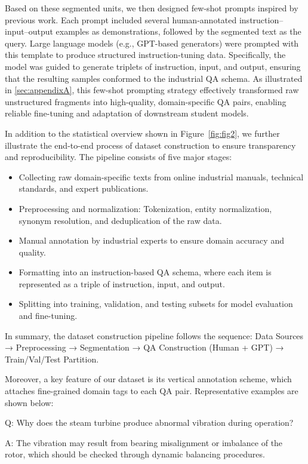 \documentclass[preprint,12pt]{elsarticle}
\def\textbf#1{#1}%
\def\textit#1{#1}%
\begin{document}
Based on these segmented units, we then designed few-shot prompts inspired by previous work\cite{Cui2025,Sahoo2024,Trivedi2025}. Each prompt included several human-annotated instruction–input–output examples as demonstrations, followed by the segmented text as the query. Large language models (e.g., GPT-based generators) were prompted with this template to produce structured instruction-tuning data. Specifically, the model was guided to generate triplets of \textit{instruction}, \textit{input}, and \textit{output}, ensuring that the resulting samples conformed to the industrial QA schema. As illustrated in \ref{sec:appendixA}, this few-shot prompting strategy effectively transformed raw unstructured fragments into high-quality, domain-specific QA pairs, enabling reliable fine-tuning and adaptation of downstream student models.

In addition to the statistical overview shown in Figure~\ref{fig:fig2}, we further illustrate the end-to-end process of dataset construction to ensure transparency and reproducibility. The pipeline consists of five major stages:

\begin{itemize}
    \item \textit{Collecting raw domain-specific texts} from online industrial manuals, technical standards, and expert publications.
    \item \textit{Preprocessing and normalization}: Tokenization, entity normalization, synonym resolution, and deduplication of the raw data.
    \item \textit{Manual annotation by industrial experts} to ensure domain accuracy and quality.
    \item \textit{Formatting into an instruction-based QA schema}, where each item is represented as a triple of \textit{instruction}, \textit{input}, and \textit{output}.
    \item \textit{Splitting into training, validation, and testing subsets} for model evaluation and fine-tuning.
\end{itemize}

In summary, the dataset construction pipeline follows the sequence: \textit{Data Sources → Preprocessing → Segmentation → QA Construction (Human + GPT) → Train/Val/Test Partition}.

Moreover, a key feature of our dataset is its vertical annotation scheme, which attaches fine-grained domain tags to each QA pair. Representative examples are shown below:

\begin{tcolorbox}[colback=gray!5!white,colframe=gray!40!black,title=\textbf{Example 1: Equipment → Fault Diagnosis}]
\textbf{Q:} Why does the steam turbine produce abnormal vibration during operation?  

\textbf{A:} The vibration may result from bearing misalignment or imbalance of the rotor, which should be checked through dynamic balancing procedures.  
\end{tcolorbox}
\end{document}
